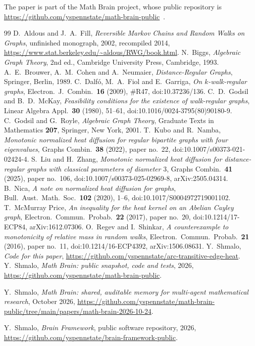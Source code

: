 \documentclass[11pt]{amsart}
\theoremstyle{definition}
\theoremstyle{remark}
\begin{document}
The paper is part of the Math Brain project, whose public repository is \url{https://github.com/yspennstate/math-brain-public}~\cite{MathBrainRepo}.

\begin{thebibliography}{99}
 D.~Aldous and J.~A.~Fill, \emph{Reversible Markov Chains and Random Walks on Graphs}, unfinished monograph, 2002, recompiled 2014, \url{https://www.stat.berkeley.edu/~aldous/RWG/book.html}.
 N.~Biggs, \emph{Algebraic Graph Theory}, 2nd ed., Cambridge University Press, Cambridge, 1993.
 A.~E.~Brouwer, A.~M.~Cohen and A.~Neumaier, \emph{Distance-Regular Graphs}, Springer, Berlin, 1989.
 C.~Dalf\'o, M.~A.~Fiol and E.~Garriga, \emph{On $k$-walk-regular graphs}, Electron.\ J.\ Combin.\ \textbf{16} (2009), \#R47, doi:10.37236/136.
 C.~D.~Godsil and B.~D.~McKay, \emph{Feasibility conditions for the existence of walk-regular graphs}, Linear Algebra Appl.\ \textbf{30} (1980), 51--61, doi:10.1016/0024-3795(80)90180-9.
 C.~Godsil and G.~Royle, \emph{Algebraic Graph Theory}, Graduate Texts in Mathematics \textbf{207}, Springer, New York, 2001.
 T.~Kubo and R.~Namba, \emph{Monotonic normalized heat diffusion for regular bipartite graphs with four eigenvalues}, Graphs Combin.\ \textbf{38} (2022), paper no.~22, doi:10.1007/s00373-021-02424-4.
 S.~Liu and H.~Zhang, \emph{Monotonic normalized heat diffusion for distance-regular graphs with classical parameters of diameter $3$}, Graphs Combin.\ \textbf{41} (2025), paper no.~106, doi:10.1007/s00373-025-02969-8, arXiv:2505.04314.
 B.~Nica, \emph{A note on normalized heat diffusion for graphs}, Bull.\ Aust.\ Math.\ Soc.\ \textbf{102} (2020), 1--6, doi:10.1017/S0004972719001102.
 T.~McMurray Price, \emph{An inequality for the heat kernel on an Abelian Cayley graph}, Electron.\ Commun.\ Probab.\ \textbf{22} (2017), paper no.~20, doi:10.1214/17-ECP84, arXiv:1612.07306.
 O.~Regev and I.~Shinkar, \emph{A counterexample to monotonicity of relative mass in random walks}, Electron.\ Commun.\ Probab.\ \textbf{21} (2016), paper no.~11, doi:10.1214/16-ECP4392, arXiv:1506.08631.
 Y.~Shmalo, \emph{Code for this paper}, \url{https://github.com/yspennstate/arc-transitive-edge-heat}.
 Y.~Shmalo, \emph{Math Brain: public snapshot, code and tests}, 2026, \url{https://github.com/yspennstate/math-brain-public}.

 Y.~Shmalo, \emph{Math Brain: shared, auditable memory for multi-agent mathematical research}, October 2026, \url{https://github.com/yspennstate/math-brain-public/tree/main/papers/math-brain-2026-10-24}.

 Y.~Shmalo, \emph{Brain Framework}, public software repository, 2026, \url{https://github.com/yspennstate/brain-framework-public}.

\end{thebibliography}
\end{document}
